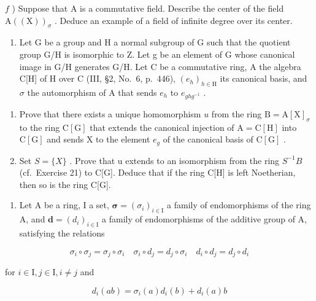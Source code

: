 \(f\) ) Suppose that A is a commutative field. Describe the center of the field \(\mathrm{A}((\mathrm{X}))_{\sigma}\) . Deduce an example of a field of infinite degree over its center.

\begin{enumerate}
\def\labelenumi{\arabic{enumi})}
\setcounter{enumi}{21}
\tightlist
\item
  Let G be a group and H a normal subgroup of G such that the quotient group G/H is isomorphic to Z. Let g be an element of G whose canonical image in G/H generates G/H. Let C be a commutative ring, A the algebra C{[}H{]} of H over C (III, §2, No.~6, p.~446), \((e_{h})_{h\in\mathrm{H}}\) its canonical basis, and \(\sigma\) the automorphism of A that sends \(e_{h}\) to \(e_{ghg^{-1}}\) .
\end{enumerate}

\begin{enumerate}
\def\labelenumi{\alph{enumi})}
\item
  Prove that there exists a unique homomorphism \(u\) from the ring \(\mathrm{B} = \mathrm{A}[\mathrm{X}]_{\sigma}\) to the ring \(\mathrm{C}[\mathrm{G}]\) that extends the canonical injection of \(\mathrm{A} = \mathrm{C}[\mathrm{H}]\) into \(\mathrm{C}[\mathrm{G}]\) and sends \(\mathrm{X}\) to the element \(e_g\) of the canonical basis of \(\mathrm{C}[\mathrm{G}]\) .
\item
  Set \(S = \{X\}\) . Prove that u extends to an isomorphism from the ring \(S^{-1}B\) (cf.~Exercise 21) to C{[}G{]}. Deduce that if the ring C{[}H{]} is left Noetherian, then so is the ring C{[}G{]}.
\end{enumerate}

\begin{enumerate}
\def\labelenumi{\arabic{enumi})}
\setcounter{enumi}{22}
\tightlist
\item
  Let A be a ring, I a set, \(\symbf{\sigma} = (\sigma_{i})_{i \in \mathrm{I}}\) a family of endomorphisms of the ring A, and \(\symbf{d} = (d_{i})_{i \in \mathrm{I}}\) a family of endomorphisms of the additive group of A, satisfying the relations
\end{enumerate}

\[
\sigma_ {i} \circ \sigma_ {j} = \sigma_ {j} \circ \sigma_ {i} \quad \sigma_ {i} \circ d _ {j} = d _ {j} \circ \sigma_ {i} \quad d _ {i} \circ d _ {j} = d _ {j} \circ d _ {i}
\]

for \(i\in \mathrm{I},j\in \mathrm{I},i\neq j\) and

\[
d _ {i} (a b) = \sigma_ {i} (a) d _ {i} (b) + d _ {i} (a) b
\]

